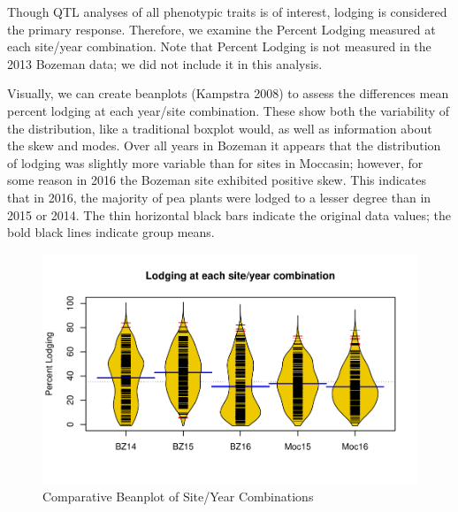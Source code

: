 \documentclass[11pt]{article}\usepackage[]{graphicx}\usepackage[]{color}
\makeatletter
\def\maxwidth{ %
  \ifdim\Gin@nat@width>\linewidth
    \linewidth
  \else
    \Gin@nat@width
  \fi
}
\newenvironment{knitrout}{}{} %
\makeatother
\begin{document}
Though QTL analyses of all phenotypic traits is of interest, lodging is considered the primary response. Therefore, we examine the Percent Lodging measured at each site/year combination. Note that Percent Lodging is not measured in the 2013 Bozeman data; we did not include it in this analysis.

Visually, we can create beanplots (Kampstra 2008) to assess the differences mean percent lodging at each year/site combination.  These show both the variability of the distribution, like a traditional boxplot would, as well as information about the skew and modes. Over all years in Bozeman it appears that the distribution of lodging was slightly more variable than for sites in Moccasin; however, for some reason in 2016 the Bozeman site exhibited positive skew.  This indicates that in 2016, the majority of pea plants were lodged to a lesser degree than in 2015 or 2014.  The thin horizontal black bars indicate the original data values; the bold black lines indicate group means. 


\begin{knitrout}\footnotesize
{}\color{fgcolor}\begin{figure}[H]

{\centering \includegraphics[width=\maxwidth]{figure/meanvars-1} 

}

\caption[Comparative Beanplot of Site/Year Combinations]{Comparative Beanplot of Site/Year Combinations}\label{fig:meanvars}
\end{figure}


\end{knitrout}
\end{document}
